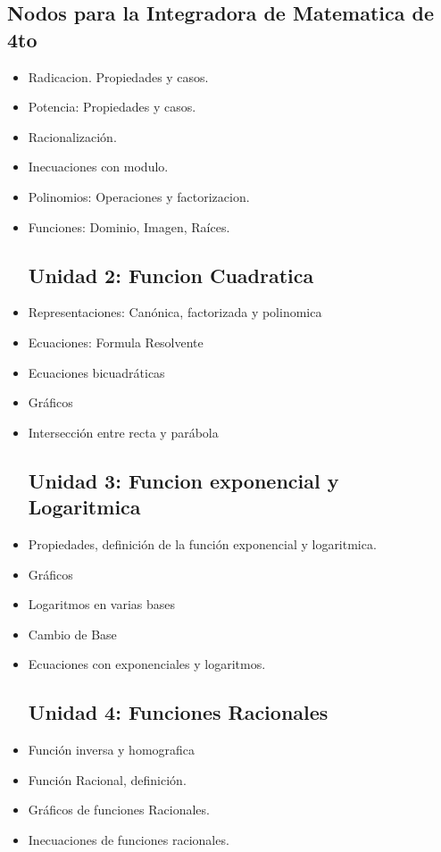 \documentclass[a4paper,10pt,spanish,sans]{exam}
\begin{document}
	\begin{center}
		\section*{Nodos para la Integradora de Matematica de 4to}
	\end{center}
	
	\begin{itemize}
		\subsection*{Unidad 1: Numeros Reales}
		\item Radicacion. Propiedades y casos.
		\item Potencia: Propiedades y casos.
		\item Racionalización.
		\item Inecuaciones con modulo.
		\item Polinomios: Operaciones y factorizacion.
		\item Funciones: Dominio, Imagen, Raíces. 
		
		\subsection*{Unidad 2: Funcion Cuadratica}
		\item Representaciones: Canónica, factorizada y polinomica
		\item Ecuaciones: Formula Resolvente
		\item Ecuaciones bicuadráticas
		\item Gráficos
		\item Intersección entre recta y parábola
		
		\subsection*{Unidad 3: Funcion exponencial y Logaritmica}
		\item Propiedades, definición de la función exponencial y logaritmica.
		\item Gráficos
		\item Logaritmos en varias bases
		\item Cambio de Base
		\item Ecuaciones con exponenciales y logaritmos.
		
		\subsection*{Unidad 4: Funciones Racionales}
		\item Función inversa y homografica
		\item Función Racional, definición.
		\item Gráficos de funciones Racionales.
		\item Inecuaciones de funciones racionales.
		

\end{itemize}
\end{document}
